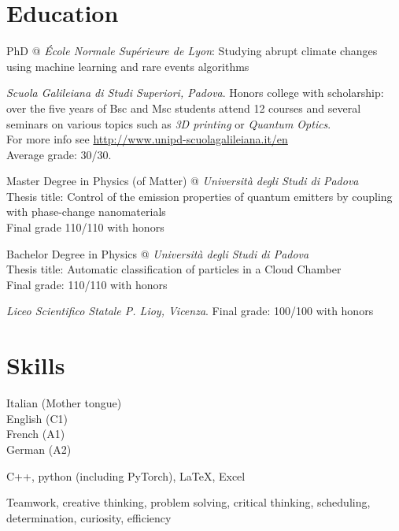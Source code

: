 \documentclass[11pt, a4 paper]{article}
\begin{document}
\section*{Education}
  \begin{description}[style=multiline,leftmargin=3cm,align=right]
    \item[2021-present]
      PhD @ \emph{\'Ecole Normale Supérieure de Lyon}: Studying abrupt climate changes using machine learning and rare
events algorithms
    \item[2016-present]
      \emph{Scuola Galileiana di Studi Superiori, Padova}. Honors college with scholarship: over the five years of Bsc and Msc students attend 12 courses and several seminars on various topics such as \emph{3D printing} or \emph{Quantum Optics}. \\ For more info see \url{http://www.unipd-scuolagalileiana.it/en} \\
      Average grade: 30/30.
    \item[2019-2021]
      Master Degree in Physics (of Matter) @ \emph{Università degli Studi di Padova} \\
      Thesis title: Control of the emission properties of quantum emitters by coupling with phase-change nanomaterials \\
      Final grade 110/110 with honors
    \item[2016-2019]
      Bachelor Degree in Physics @ \emph{Università degli Studi di Padova} \\
      Thesis title: Automatic classification of particles in a Cloud Chamber \\
      Final grade: 110/110 with honors
    \item[2011-2016]
      \emph{Liceo Scientifico Statale P. Lioy, Vicenza}. Final grade: 100/100 with honors
  \end{description}




\section*{Skills}
  \begin{description}[style=multiline,leftmargin=3cm,align=right]
    \item[Languages]
      Italian (Mother tongue) \\
      English (C1) \\
      French (A1) \\
      German (A2)
    \item[Software]
      C++, python (including PyTorch), LaTeX, Excel
    \item[Transversal]
      Teamwork, creative thinking, problem solving, critical thinking, scheduling, determination, curiosity, efficiency
  \end{description}
\end{document}
